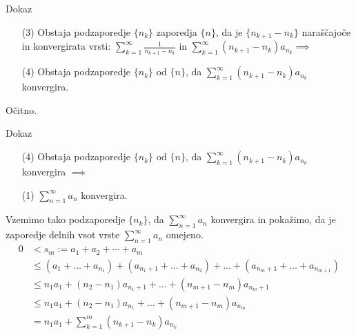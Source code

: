\documentclass{beamer}
\begin{document}
\begin{frame}{Dokaz}
    \begin{block}{}
        \begin{enumerate} 
            \item[(3)] Obstaja podzaporedje $\{n_k\}$ zaporedja $\{n\}$, da je $\{n_{k+1} - n_k\}$ 
            naraščajoče in konvergirata vrsti:
            $\sum_{k = 1}^{\infty}{\frac{1}{n_{k+1} - n_k}}$ in 
            $\sum_{k = 1}^{\infty}{(n_{k+1} - n_k)a_{n_k}} \implies$
            \item[(4)] Obstaja podzaporedje $\{n_k\}$ od $\{n\}$, da 
            $\sum_{k = 1}^{\infty}{(n_{k+1} - n_k)a_{n_k}}$ konvergira.

        \end{enumerate}
    \end{block} 
    
    \vspace{0.3cm}
    \pause
    
    Očitno.\\
    
\end{frame}


\begin{frame}{Dokaz}
    \begin{block}{}
        \begin{enumerate}  
            \item[(4)] Obstaja podzaporedje $\{n_k\}$ od $\{n\}$, da 
            $\sum_{k = 1}^{\infty}{(n_{k+1} - n_k)a_{n_k}}$ konvergira $\implies$
            \item[(1)] $\sum_{n = 1}^{\infty}{a_n}$ konvergira.
        \end{enumerate}
    \end{block} 
    \pause
    
    Vzemimo tako podzaporedje  $\{n_k\}$, da $\sum_{n = 1}^{\infty}{a_n}$ konvergira in pokažimo, da je zaporedje delnih vsot
    vrste $\sum_{n = 1}^{\infty}{a_n}$ omejeno.
    \pause
    \[
    \begin{split}
        0 & < s_m := a_1 + a_2 + \cdots + a_m \\
        & \leq (a_1 + \ldots + a_{n_1}) + (a_{n_{1} + 1} + \ldots + a_{n_{2}})
        + \ldots  + (a_{n_{m} + 1} + \ldots + a_{n_{m+1}})\\
        & \leq n_{1}a_{1} + (n_2 - n_1)a_{n_{1} + 1} + \ldots + (n_{m+1} - n_m)a_{n_{m}+1}\\
        & \leq n_{1}a_{1} + (n_2 - n_1)a_{n_1} + \ldots + (n_{m+1} - n_{m})a_{n_{m}}\\
        & = n_{1}a_{1} + \sum_{k = 1}^{m}{(n_{k+1} - n_k)a_{n_k}}
    \end{split}
    \]

\end{frame}
\end{document}
